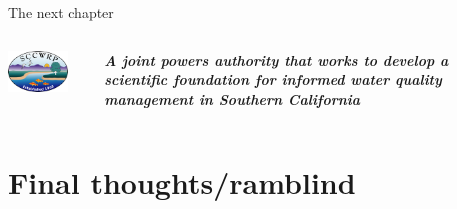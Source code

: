 \documentclass[serif]{beamer}\usepackage[]{graphicx}\usepackage[]{color}
\newcommand{\emtxt}[1]{\textbf{\textit{#1}}}
\begin{document}
\begin{frame}[t]{The next chapter}{}
\begin{columns}
\begin{column}{0.3\textwidth}
\centerline{\includegraphics[width = 0.8\textwidth]{fig/sccwrp.png}}
\end{column}
\begin{column}{0.7\textwidth}
\emtxt{A joint powers authority that works to develop a scientific foundation for informed water quality management in Southern California}
\end{column}
\end{columns}
\vspace{0.25in}
\centerline{}
\end{frame}

\section{Final thoughts/ramblind}
\end{document}

